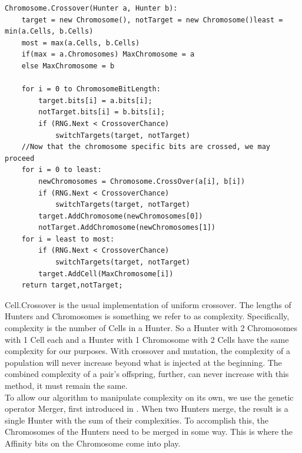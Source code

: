 \begin{lstlisting}[language = algorithm, caption={Chromosome Crossover}, label={fig:ChromoXover}]
Chromosome.Crossover(Hunter a, Hunter b):
	target = new Chromosome(), notTarget = new Chromosome()least = min(a.Cells, b.Cells)
	most = max(a.Cells, b.Cells)
	if(max = a.Chromosomes) MaxChromosome = a
	else MaxChromosome = b
	
	for i = 0 to ChromosomeBitLength:
		target.bits[i] = a.bits[i];
		notTarget.bits[i] = b.bits[i];
		if (RNG.Next < CrossoverChance)
			switchTargets(target, notTarget)
	//Now that the chromosome specific bits are crossed, we may proceed	
	for i = 0 to least:
		newChromosomes = Chromosome.CrossOver(a[i], b[i])
		if (RNG.Next < CrossoverChance)
			switchTargets(target, notTarget)
		target.AddChromosome(newChromosomes[0])
		notTarget.AddChromosome(newChromosomes[1])
	for i = least to most:
		if (RNG.Next < CrossoverChance) 
			switchTargets(target, notTarget)	
		target.AddCell(MaxChromosome[i])
	return target,notTarget;
\end{lstlisting}
Cell.Crossover is the usual implementation of uniform crossover.
The lengths of Hunters and Chromosomes is something we refer to as complexity.  Specifically, complexity is the number of Cells in a Hunter.  So a Hunter with 2 Chromosomes with 1 Cell each and a Hunter with 1 Chromosome with 2 Cells have the same complexity for our purposes.  
With crossover and mutation, the complexity of a population will never increase beyond what is injected at the beginning.  The combined complexity of a pair's offspring, further, can never increase with this method, it must remain the same.\\
To allow our algorithm to manipulate complexity on its own, we use the genetic operator Merger, first introduced in \cite{kharma_project_2004}.  When two Hunters merge, the result is a single Hunter with the sum of their complexities.  To accomplish this, the Chromosomes of the Hunters need to be merged in some way.  This is where the Affinity bits on the Chromosome come into play.\\
